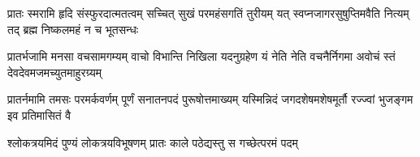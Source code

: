 
\fourlineindentedshloka
{प्रातः स्मरामि हृदि संस्फुरदात्मतत्वम्}
{सच्चित् सुखं परमहंसगतिं तुरीयम्}
{यत् स्वप्नजागरसुषुप्तिमवैति नित्यम्}
{तद् ब्रह्म निष्कलमहं न च भूतसन्धः}
        
\fourlineindentedshloka
{प्रातर्भजामि मनसा वचसामगम्यम्}
{वाचो विभान्ति निखिला यदनुग्रहेण}
{यं नेति नेति वचनैर्निगमा अवोचं}
{स्तं देवदेवमजमच्युतमाहुरग्र्यम्}
            
\fourlineindentedshloka
{प्रातर्नमामि तमसः परमर्कवर्णम्}
{पूर्णं सनातनपदं पुरूषोत्तमाख्यम्}
{यस्मिन्निदं जगदशेषमशेषमूर्तौ}
{रज्ज्वां भुजङ्गम इव प्रतिमासितं वै}
            
\twolineshloka
{श्लोकत्रयमिदं पुण्यं लोकत्रयविभूषणम्}
{प्रातः काले पठेद्यस्तु स गच्छेत्परमं पदम्}
            
            
\closesection
